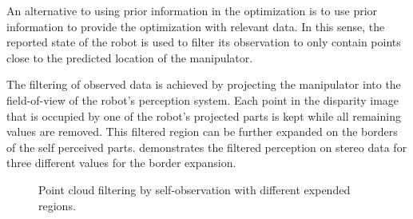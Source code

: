 An alternative to using prior information in the optimization is to use prior information to provide the optimization with relevant data. In this sense, the reported state of the robot is used to filter its observation to only contain points close to the predicted location of the manipulator.

The filtering of observed data is achieved by projecting the manipulator into the field-of-view of the robot's perception system. Each point in the disparity image that is occupied by one of the robot's projected parts is kept while all remaining values are removed. This filtered region can be further expanded on the borders of the self perceived parts.  demonstrates the filtered perception on stereo data for three different values for the border expansion.

\begin{figure}[h]
\centering
{}
\caption{Point cloud filtering by self-observation with different expended regions.}
\label{fig:self_observation_region}
\end{figure}

